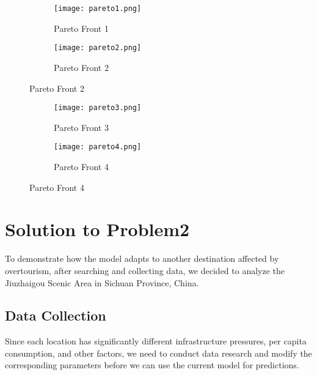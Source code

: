 \documentclass[12pt]{article}  %
\begin{document}
\begin{figure}[htbp]
\centering
\begin{subfigure}[b]{.4\textwidth}
\texttt{[image: pareto1.png]}
\caption{Pareto Front 1}\label{subfig:left1}
\end{subfigure}
\begin{subfigure}[b]{.4\textwidth}
	\texttt{[image: pareto2.png]}
	\caption{Pareto Front 2}\label{subfig:right1}
\end{subfigure}
\end{figure}

\begin{figure}[htbp]
	\centering
	\begin{subfigure}[b]{.4\textwidth}
		\texttt{[image: pareto3.png]}
		\caption{Pareto Front 3}\label{subfig:left2}
	\end{subfigure}
	\begin{subfigure}[b]{.4\textwidth}
		\texttt{[image: pareto4.png]}
		\caption{Pareto Front 4}\label{subfig:right2}
	\end{subfigure}
\end{figure}

\section{Solution to Problem2}
To demonstrate how the model adapts to another destination affected by overtourism, after searching and collecting data, we decided to analyze the Jiuzhaigou Scenic Area in Sichuan Province, China.
\subsection{Data Collection}
Since each location has significantly different infrastructure pressures, per capita consumption, and other factors, we need to conduct data research and modify the corresponding parameters before we can use the current model for predictions.
\end{document}
